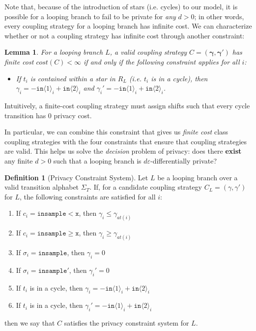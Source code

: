 \documentclass[12pt]{article}
\newcommand{\gguard}[1][x]{\texttt{insample}\geq#1}
\newcommand{\lguard}[1][x]{\texttt{insample} < #1}
\newcommand{\brangle}[1]{\langle#1 \rangle}
\newtheorem{lemma}[thm]{Lemma}
\theoremstyle{definition}
\newtheorem{defn}[thm]{Definition}
\begin{document}
Note that, because of the introduction of stars (i.e. cycles) to our model, it is possible for a looping branch to fail to be private for \textit{any} $d>0$; in other words, every coupling strategy for a looping branch has infinite cost. We can characterize whether or not a coupling strategy has infinite cost through another constraint:

\begin{lemma}\label{finiteCostConstraintLemma}
    For a looping branch $L$, a valid coupling strategy $C = (\mathbf{\gamma}, \mathbf{\gamma}')$ has finite cost $cost(C)<\infty$ if and only if the following constraint applies for all $i$:
    \begin{itemize}
        \item If $t_i$ is contained within a star in $R_L$ (i.e. $t_i$ is in a cycle), then $\gamma_i = -\texttt{in}\brangle{1}_i+\texttt{in}\brangle{2}_i$ and $\gamma_i' = -\texttt{in}\brangle{1}_i+\texttt{in}\brangle{2}_i$.
    \end{itemize}
\end{lemma}

Intuitively, a finite-cost coupling strategy must assign shifts such that every cycle transition has 0 privacy cost. 


In particular, we can combine this constraint that gives us \textit{finite cost} class coupling strategies with the four constraints that ensure that coupling strategies are valid. This helps us solve the \textit{decision} problem of privacy: does there \textbf{exist} any finite $d>0$ such that a looping branch is $d\varepsilon$-differentially private?

\begin{defn}[Privacy Constraint System]\label{privacyConstraintSystem}
    Let $L$ be a looping branch over a valid transition alphabet $\Sigma_T$. If, for a candidate coupling strategy $C_L = (\gamma, \gamma')$ for $L$, the following constraints are satisfied for all $i$: \begin{enumerate}
        \item If $c_i = \lguard[\texttt{x}]$, then $\gamma_i\leq\gamma_{at(i)}$
        \item If $c_i = \gguard[\texttt{x}]$, then $\gamma_i\geq\gamma_{at(i)}$
        \item If $\sigma_i = \texttt{insample}$, then $\gamma_i=0$
        \item If $\sigma_i = \texttt{insample}'$, then $\gamma_i'=0$
        \item If $t_i$ is in a cycle, then $\gamma_i = -\texttt{in}\brangle{1}_i+\texttt{in}\brangle{2}_i$
        \item If $t_i$ is in a cycle, then $\gamma_i' = -\texttt{in}\brangle{1}_i+\texttt{in}\brangle{2}_i$
    \end{enumerate}
    then we say that $C$ satisfies the privacy constraint system for $L$. 
\end{defn}
\end{document}
